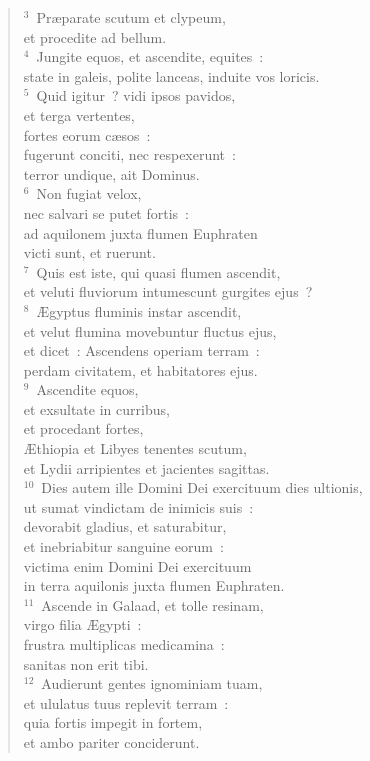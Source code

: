 \begin{flushleft}\begin{verse}${}^{3}$~Pr\ae parate scutum et clypeum,\\ et procedite ad bellum.\\
${}^{4}$~Jungite equos, et ascendite, equites~:\\ state in galeis, polite lanceas, induite vos loricis.\\
${}^{5}$~Quid igitur~? vidi ipsos pavidos,\\ et terga vertentes,\\ fortes eorum c\ae sos~:\\ fugerunt conciti, nec respexerunt~:\\ terror undique, ait Dominus.\\
${}^{6}$~Non fugiat velox,\\ nec salvari se putet fortis~:\\ ad aquilonem juxta flumen Euphraten\\ victi sunt, et ruerunt.\\
${}^{7}$~Quis est iste, qui quasi flumen ascendit,\\ et veluti fluviorum intumescunt gurgites ejus~?\\
${}^{8}$~\AE gyptus fluminis instar ascendit,\\ et velut flumina movebuntur fluctus ejus,\\ et dicet~: Ascendens operiam terram~:\\ perdam civitatem, et habitatores ejus.\\
${}^{9}$~Ascendite equos,\\ et exsultate in curribus,\\ et procedant fortes,\\ \AE thiopia et Libyes tenentes scutum,\\ et Lydii arripientes et jacientes sagittas.\\
${}^{10}$~Dies autem ille Domini Dei exercituum dies ultionis,\\ ut sumat vindictam de inimicis suis~:\\ devorabit gladius, et saturabitur,\\ et inebriabitur sanguine eorum~:\\ victima enim Domini Dei exercituum\\ in terra aquilonis juxta flumen Euphraten.\\
${}^{11}$~Ascende in Galaad, et tolle resinam,\\ virgo filia \AE gypti~:\\ frustra multiplicas medicamina~:\\ sanitas non erit tibi.\\
${}^{12}$~Audierunt gentes ignominiam tuam,\\ et ululatus tuus replevit terram~:\\ quia fortis impegit in fortem,\\ et ambo pariter conciderunt.\end{verse}\end{flushleft}


